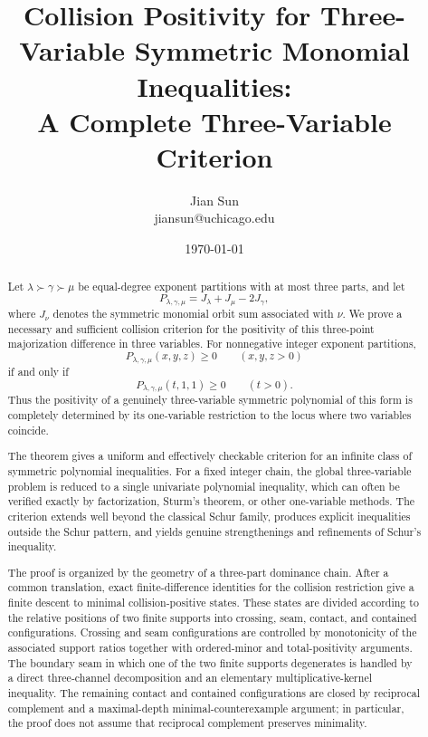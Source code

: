 \documentclass[11pt]{article}
\title{Collision Positivity for Three-Variable Symmetric Monomial Inequalities:\\A Complete Three-Variable Criterion}
\author{Jian Sun \\jiansun@uchicago.edu}
\date{\today}
\theoremstyle{definition}
\begin{document}
\maketitle

\begin{abstract}
Let \(\lambda\succ\gamma\succ\mu\) be equal-degree exponent partitions with at most three parts, and let
\begin{equation*}
P_{\lambda,\gamma,\mu}
=
J_\lambda+J_\mu-2J_\gamma,
\end{equation*}
where \(J_\nu\) denotes the symmetric monomial orbit sum associated with \(\nu\).  We prove a necessary and sufficient collision criterion for the positivity of this three-point majorization difference in three variables.  For nonnegative integer exponent partitions,
\begin{equation*}
P_{\lambda,\gamma,\mu}(x,y,z)\ge0
\qquad(x,y,z>0)
\end{equation*}
if and only if
\begin{equation*}
P_{\lambda,\gamma,\mu}(t,1,1)\ge0
\qquad(t>0).
\end{equation*}
Thus the positivity of a genuinely three-variable symmetric polynomial of this form is completely determined by its one-variable restriction to the locus where two variables coincide.

The theorem gives a uniform and effectively checkable criterion for an infinite class of symmetric polynomial inequalities.  For a fixed integer chain, the global three-variable problem is reduced to a single univariate polynomial inequality, which can often be verified exactly by factorization, Sturm's theorem, or other one-variable methods.  The criterion extends well beyond the classical Schur family, produces explicit inequalities outside the Schur pattern, and yields genuine strengthenings and refinements of Schur's inequality.

The proof is organized by the geometry of a three-part dominance chain.  After a common translation, exact finite-difference identities for the collision restriction give a finite descent to minimal collision-positive states.  These states are divided according to the relative positions of two finite supports into crossing, seam, contact, and contained configurations.  Crossing and seam configurations are controlled by monotonicity of the associated support ratios together with ordered-minor and total-positivity arguments.  The boundary seam in which one of the two finite supports degenerates is handled by a direct three-channel decomposition and an elementary multiplicative-kernel inequality.  The remaining contact and contained configurations are closed by reciprocal complement and a maximal-depth minimal-counterexample argument; in particular, the proof does not assume that reciprocal complement preserves minimality.


\end{abstract}
\end{document}
